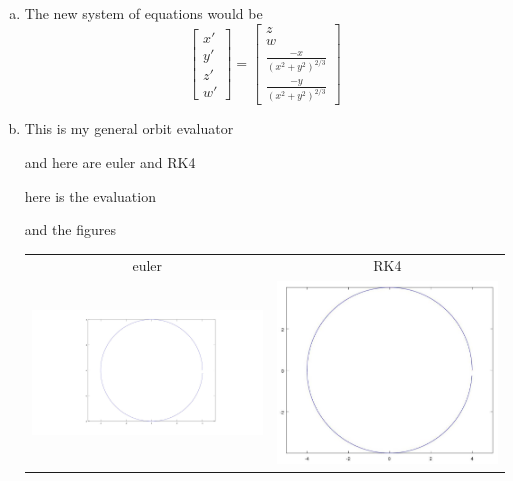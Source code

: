 \documentclass[12pt]{article}
\theoremstyle{homework}
\begin{document}
\begin{enumerate}[(a)]
\item
The new system of equations would be 
$$\begin{bmatrix}
x'\\
y'\\
z'\\
w'
\end{bmatrix}
=
\begin{bmatrix}
z\\
w\\
\frac{-x}{(x^2+y^2)^{2/3}}\\
\frac{-y}{(x^2+y^2)^{2/3}}
\end{bmatrix}$$
\item
This is my general orbit evaluator

and here are euler and RK4


here is the evaluation

and the figures\\
\begin{tabular}{c c}
euler & RK4\\
\includegraphics[scale=.15]{../octave/f2.jpg} & \includegraphics[scale=.3]{../octave/f3.jpg}

\end{tabular}
\end{enumerate}
\end{document}

